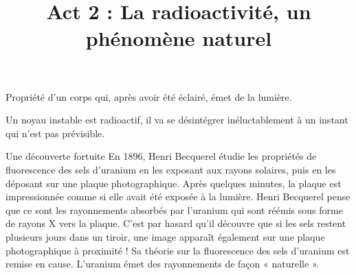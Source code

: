 \documentclass[24pt]{article}
\newcommand{\titreActivite}{\huge Act 2 : La radioactivité, un phénomène naturel} %
\begin{document}
\thispagestyle{fancy}

\date{}
\title{\titreActivite}
\maketitle %


\begin{minipage}[c]{0.45\textwidth}
    \begin{definition}[Fluorescence]
        Propriété d’un corps qui, après avoir été éclairé, émet de la lumière.
    \end{definition}
\end{minipage}
\hspace{0.1\textwidth}
\begin{minipage}[c]{0.45\textwidth}
    \begin{definition}
        Un noyau instable est radioactif, il va se désintégrer inéluctablement à un instant qui n’est pas prévisible.
    \end{definition}
\end{minipage}


\begin{documentpeda}{Une découverte fortuite}
    En 1896, Henri Becquerel étudie les propriétés de fluorescence des sels d’uranium en
    les exposant aux rayons solaires, puis en les déposant sur une plaque photographique.
    Après quelques minutes, la plaque est impressionnée comme si elle avait été exposée à la lumière.
    Henri Becquerel pense
    que ce sont les rayonnements absorbés par l’uranium qui sont réémis sous forme de rayons X vers la plaque.
    C’est par hasard qu’il découvre que si les sels restent plusieurs jours dans un tiroir, une image apparaît
    également sur une plaque photographique à proximité ! Sa théorie sur la fluorescence des sels d’uranium
    est remise en cause. L’uranium émet des rayonnements de façon « naturelle ».
\end{documentpeda}
\end{document}
